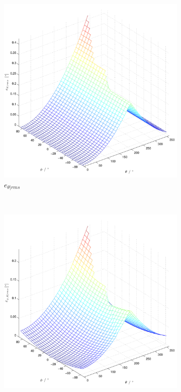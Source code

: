 \begin{figure}
\begin{subfigure}[b]{0.48\textwidth}
                \includegraphics[width=\textwidth]{images/02_Konzeptionierung/angle_error_theta}
                \caption{$e_{\theta | rms}$}
                \label{fig:angle_error_theta}
        \end{subfigure}
        ~ %
        \begin{subfigure}[b]{0.48\textwidth}
                \centering
                \includegraphics[width=\textwidth]{images/02_Konzeptionierung/angle_error_mid}

\end{subfigure}
\end{figure}
